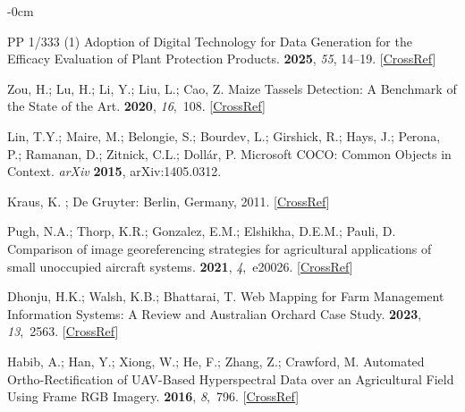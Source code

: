 \documentclass[12pt,a4paper,oneside]{report}
\newlength{\extralength}
\begin{document}
\begin{adjustwidth}{-\extralength}{0cm}
\begin{thebibliography}{999}
{{{\textsc{PP}}}} 1/333 (1) {{Adoption}} of Digital Technology for Data
Generation for the Efficacy Evaluation of Plant Protection Products.
 {\bf 2025}, {\em 55}, 14--19. [\href{http://dx.doi.org/10.1111/epp.13037}{CrossRef}]

Zou, H.; Lu, H.; Li, Y.; Liu, L.; Cao, Z.
\newblock Maize Tassels Detection: A Benchmark of the State of the Art.
 {\bf 2020}, {\em 16},~108. [\href{http://dx.doi.org/10.1186/s13007-020-00651-z}{CrossRef}]

Lin, T.Y.; Maire, M.; Belongie, S.; Bourdev, L.; Girshick, R.; Hays, J.;
Perona, P.; Ramanan, D.; Zitnick, C.L.; Doll{\'a}r, P.
\newblock Microsoft {{COCO}}: {{Common Objects}} in {{Context}}. {\em arXiv} {\bf 2015}, arXiv:1405.0312.

Kraus, K.
; De Gruyter: Berlin, Germany, 2011. [\href{http://dx.doi.org/10.1515/9783110892871}{CrossRef}]

Pugh, N.A.; Thorp, K.R.; Gonzalez, E.M.; Elshikha, D.E.M.; Pauli, D.
\newblock Comparison of image georeferencing strategies for agricultural
applications of small unoccupied aircraft systems.
 {\bf 2021}, {\em 4},~e20026. [\href{http://dx.doi.org/10.1002/ppj2.20026}{CrossRef}]

Dhonju, H.K.; Walsh, K.B.; Bhattarai, T.
\newblock Web {Mapping} for {Farm} {Management} {Information} {Systems}: {A}
{Review} and {Australian} {Orchard} {Case} {Study}.
 {\bf 2023}, {\em 13},~2563. [\href{http://dx.doi.org/10.3390/agronomy13102563}{CrossRef}]

Habib, A.; Han, Y.; Xiong, W.; He, F.; Zhang, Z.; Crawford, M.
\newblock Automated {Ortho}-{Rectification} of {UAV}-{Based} {Hyperspectral}
{Data} over an {Agricultural} {Field} {Using} {Frame} {RGB} {Imagery}.
 {\bf 2016}, {\em 8},~796. [\href{http://dx.doi.org/10.3390/rs8100796}{CrossRef}]


\end{thebibliography}
\end{adjustwidth}
\end{document}
